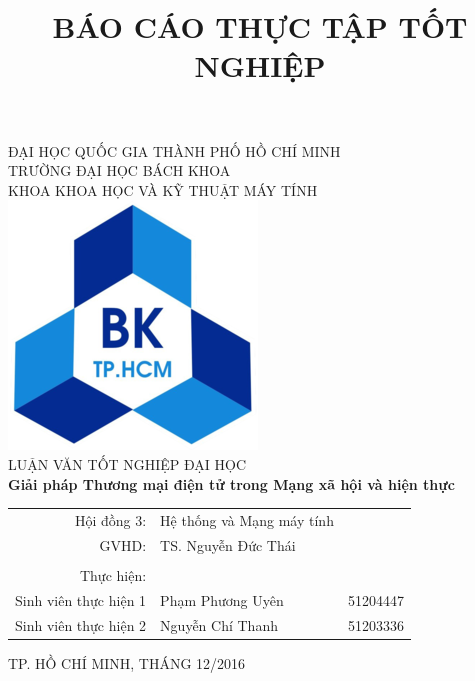 \documentclass[a4paper,13pt,times,numbered,print,index]{report}
\title{BÁO CÁO THỰC TẬP TỐT NGHIỆP}
\begin{document}
	\begin{center}
		{ ĐẠI HỌC QUỐC GIA THÀNH PHỐ HỒ CHÍ MINH \\
			TRƯỜNG ĐẠI HỌC BÁCH KHOA \\
			KHOA KHOA HỌC VÀ KỸ THUẬT MÁY TÍNH} 
		\\
		\bigskip
		\bigskip
		\bigskip
		\includegraphics[scale=.4]{Graphics/bachkhoa_logo}\\
		\bigskip
		\bigskip
		\bigskip
		LUẬN VĂN TỐT NGHIỆP ĐẠI HỌC \\
		\bigskip
		{\Huge \textbf{Giải pháp Thương mại điện tử trong Mạng xã hội và hiện thực}}
		\bigskip

		
		\begin{table}[h]
			
			\begin{tabular}{rll}
				\hspace{5 cm}  Hội đồng 3: & Hệ thống và Mạng máy tính \\
				\hspace{5 cm}  GVHD: & TS. Nguyễn Đức Thái \\
				\\
				 Thực hiện: \\
				Sinh viên thực hiện 1& Phạm Phương Uyên & 51204447 \\
				Sinh viên thực hiện 2 & Nguyễn Chí Thanh & 51203336 \\
			\end{tabular}
		\end{table}
		\vspace*{\fill}
		{\footnotesize TP. HỒ CHÍ MINH, THÁNG 12/2016}
	\end{center}
	\thispagestyle{empty}
	
	\newpage
		
\end{document}
